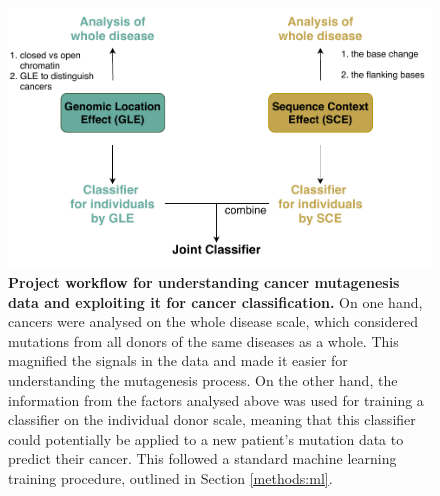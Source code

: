 \begin{figure}[h!]
    \centering
    \includegraphics[scale=0.85]{graphics/workflow.pdf}
    \caption{\textbf{Project workflow for understanding cancer mutagenesis data and exploiting it for cancer classification.} On one hand, cancers were analysed on the whole disease scale, which considered mutations from all donors of the same diseases as a whole. This magnified the signals in the data and made it easier for understanding the mutagenesis process. On the other hand, the information from the factors analysed above was used for training a classifier on the individual donor scale, meaning that this classifier could potentially be applied to a new patient's mutation data to predict their cancer. This followed a standard machine learning training procedure, outlined in Section \ref{methods:ml}.}
    \label{fig:workflow}
\end{figure}
